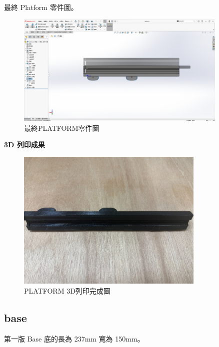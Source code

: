 \newpage


最終 Platform 零件圖。

\begin{figure}[htbp]
    \centering
    \includegraphics[width=0.9\textwidth]{./../images/6-1-22}
    \caption{最終PLATFORM零件圖}
\end{figure}

\textbf{3D 列印成果}

\begin{figure}[htbp]
    \centering
    \includegraphics[width=0.8\textwidth]{./../images/6-1-26}
    \caption{PLATFORM 3D列印完成圖}
\end{figure}

\newpage

\subsection*{base}

第一版 Base 底的長為 237mm 寬為 150mm。

